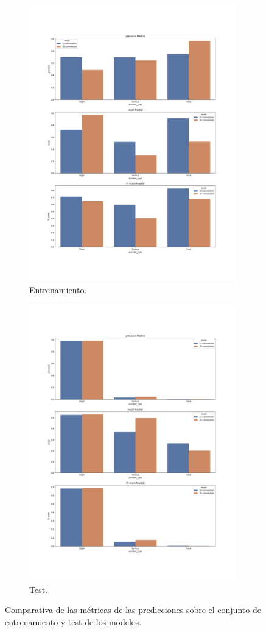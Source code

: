     \begin{figure}[H]
      \hspace{-2em}
      \begin{subfigure}{0.4\textwidth}        
        \includegraphics[width=9cm]{archivos/5.Resultados/ComparativaCNNTrain}
        \captionsetup{singlelinecheck = false, justification=centering, font=footnotesize}
        \caption{Entrenamiento.}
        \label{ResultsCNNImage:Train}
      \end{subfigure}
      \hspace{8mm}
      \begin{subfigure}{0.4\textwidth}        
        \centering
        \includegraphics[width=9cm]{archivos/5.Resultados/ComparativaCNNTest}
        \caption{Test.}
        \label{ResultsCNNImage:Test}
      \end{subfigure}
      \caption{Comparativa de las métricas de las predicciones sobre el conjunto de entrenamiento y test de los modelos.}
      \label{ResultsCNNImage}
    \end{figure}




